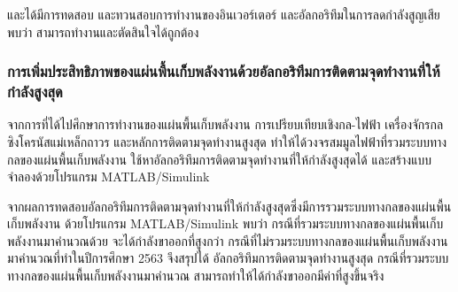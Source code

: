 \documentclass[11pt,a4paper]{article}
\begin{document}
และได้มีการทดสอบ และทวนสอบการทำงานของอินเวอร์เตอร์ และอัลกอริทึมในการลดกำลังสูญเสีย พบว่า สามารถทำงานและตัดสินใจได้ถูกต้อง

\subsubsection{การเพิ่มประสิทธิภาพของแผ่นพื้นเก็บพลังงานด้วยอัลกอริทึมการติดตามจุดทำงานที่ให้กำลังสูงสุด}
จากการที่ได้ไปศึกษาการทำงานของแผ่นพื้นเก็บพลังงาน การเปรียบเทียบเชิงกล-ไฟฟ้า เครื่องจักรกลซิงโครนัสแม่เหล็กถาวร และหลักการติดตามจุดทำงานสูงสุด
ทำให้ได้วงจรสมมูลไฟฟ้าที่รวมระบบทางกลของแผ่นพื้นเก็บพลังงาน ใช้หาอัลกอริทึมการติดตามจุดทำงานที่ให้กำลังสูงสุดได้ และสร้างแบบจำลองด้วยโปรแกรม MATLAB/Simulink

จากผลการทดสอบอัลกอริทึมการติดตามจุดทำงานที่ให้กำลังสูงสุดซึ่งมีการรวมระบบทางกลของแผ่นพื้นเก็บพลังงาน ด้วยโปรแกรม MATLAB/Simulink
พบว่า กรณีที่รวมระบบทางกลของแผ่นพื้นเก็บพลังงานมาคำนวณด้วย จะได้กำลังขาออกที่สูงกว่า กรณีที่ไม่รวมระบบทางกลของแผ่นพื้นเก็บพลังงานมาคำนวณที่ทำในปีการศึกษา 2563
จึงสรุปได้ อัลกอริทึมการติดตามจุดทำงานสูงสุด กรณีที่รวมระบบทางกลของแผ่นพื้นเก็บพลังงานมาคำนวณ สามารถทำให้ได้กำลังขาออกมีค่าที่สูงขึ้นจริง  
\end{document}
